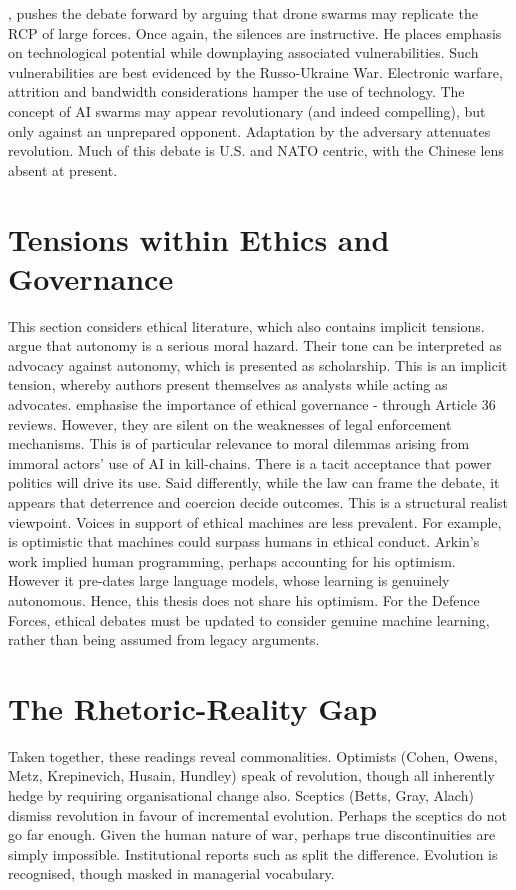 \textcite{HUSAIN_2021}, pushes the debate forward by arguing that drone swarms may replicate the RCP of large forces. Once again, the silences are instructive. He places emphasis on technological potential while downplaying associated vulnerabilities. Such vulnerabilities are best evidenced by the Russo-Ukraine War. Electronic warfare, attrition and bandwidth considerations hamper the use of technology. The concept of AI swarms may appear revolutionary (and indeed compelling), but only against an unprepared opponent. Adaptation by the adversary attenuates revolution. Much of this debate is U.S. and NATO centric, with the Chinese lens absent at present.


\section{Tensions within Ethics and Governance}
This section considers ethical literature, which also contains implicit tensions. \textcite{SINGER_2010,SPARROW_2016} argue that autonomy is a serious moral hazard. Their tone can be interpreted as advocacy against autonomy, which is presented as scholarship. This is an implicit tension, whereby authors present themselves as analysts while acting as advocates. \textcite{SAUER_2020,ALTMANN_2017} emphasise the importance of ethical governance - through Article 36 reviews. However, they are silent on the weaknesses of legal enforcement mechanisms. This is of particular relevance to moral dilemmas arising from immoral actors' use of AI in kill-chains. There is a tacit acceptance that  power politics will drive its use. Said differently, while the law can frame the debate, it appears that deterrence and coercion decide outcomes. This is a structural realist viewpoint. Voices in support of ethical machines are less prevalent. For example, \textcite{ARKIN_2008} is optimistic that machines could surpass humans in ethical conduct. Arkin's work implied human programming, perhaps accounting for his optimism. However it pre-dates large language models, whose learning is genuinely autonomous. Hence, this thesis does not share his optimism. For the Defence Forces, ethical debates must be updated to consider genuine machine learning, rather than being assumed from legacy arguments.

\section{The Rhetoric-Reality Gap}
Taken together, these readings reveal commonalities. Optimists (Cohen, Owens, Metz, Krepinevich, Husain, Hundley) speak of revolution, though all inherently hedge by requiring organisational change also. Sceptics (Betts, Gray, Alach) dismiss revolution in favour of incremental evolution. Perhaps the sceptics do not go far enough. Given the human nature of war, perhaps true discontinuities are simply impossible. Institutional reports such as \textcite{STIMSON_2015} split the difference. Evolution is recognised, though masked in managerial vocabulary. 

